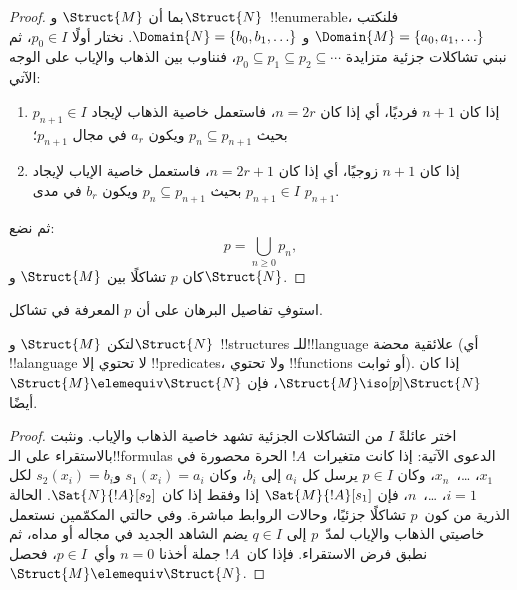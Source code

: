 \documentclass[../../../include/open-logic-section]{subfiles}
\begin{document}
\begin{proof}
  بما أن $\Struct{M}$ و$\Struct{N}$~!!{enumerable}، فلنكتب
  $\Domain{M} = \{a_0, a_1, \ldots \}$ و
  $\Domain{N} = \{b_0, b_1, \ldots \}$. نختار أولًا $p_0 \in I$،
  ثم نبني تشاكلات جزئية متزايدة
  $p_0 \subseteq p_1 \subseteq p_2 \subseteq \cdots$، فنناوب
  بين الذهاب والإياب على الوجه الآتي:
  \begin{enumerate}
  \item إذا كان $n+1$ فرديًا، أي إذا كان $n = 2r$، فاستعمل خاصية الذهاب
    لإيجاد $p_{n+1} \in I$ بحيث $p_n \subseteq p_{n+1}$ ويكون $a_r$
    في مجال $p_{n+1}$؛
  \item إذا كان $n+1$ زوجيًا، أي إذا كان $n=2r+1$، فاستعمل خاصية الإياب
    لإيجاد $p_{n+1} \in I$ بحيث $p_n \subseteq p_{n+1}$ ويكون $b_r$
    في مدى $p_{n+1}$.
  \end{enumerate}
ثم نضع:
\[
p = \bigcup_{n\ge 0} p_n,
\]
كان $p$ تشاكلًا بين $\Struct{M}$ و$\Struct{N}$.
\end{proof}

\begin{prob}
  استوفِ تفاصيل البرهان على أن $p$ المعرفة في
   تشاكل.
\end{prob}

\begin{thm}
  لتكن $\Struct{M}$ و$\Struct{N}$~!!{structure}s للـ!!{language} علائقية
  محضة (أي !!a{language} لا تحتوي إلا !!{predicate}s، ولا تحتوي
  !!{function}s أو ثوابت). إذا كان $\Struct{M} \iso[p] \Struct{N}$،
  فإن $\Struct{M} \elemequiv \Struct{N}$ أيضًا.
\end{thm}

\begin{proof}
  اختر عائلةً $I$ من التشاكلات الجزئية تشهد خاصية الذهاب والإياب.
  ونثبت بالاستقراء على الـ!!{formula}s الدعوى الآتية: إذا كانت
  متغيرات~$!A$ الحرة محصورة في $x_1$، \dots،~$x_n$، وكان $p\in I$
  يرسل كل $a_i$ إلى $b_i$، وكان $s_1(x_i)=a_i$ و$s_2(x_i)=b_i$
  لكل $i=1$، \dots،~$n$، فإن $\Sat{M}{!A}[s_1]$ إذا وفقط إذا كان
  $\Sat{N}{!A}[s_2]$. الحالة الذرية من كون~$p$ تشاكلًا جزئيًا،
  وحالات الروابط مباشرة. وفي حالتي المكمّمين نستعمل خاصيتي الذهاب
  والإياب لمدّ~$p$ إلى $q\in I$ يضم الشاهد الجديد في مجاله أو مداه،
  ثم نطبق فرض الاستقراء. فإذا كان~$!A$ جملة أخذنا $n=0$ وأي~$p\in I$،
  فحصل $\Struct{M} \elemequiv \Struct{N}$.
\end{proof}
\end{document}
